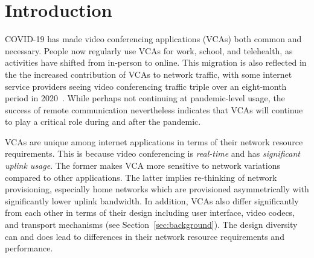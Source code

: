 \section{Introduction}\label{sec:intro}
COVID-19 has made video conferencing applications (VCAs) both common and necessary. People now regularly use VCAs for work, school, and telehealth, as activities have shifted from in-person to online. This migration is also reflected in the the increased contribution of VCAs to network traffic, with some internet service providers seeing video conferencing traffic triple over an eight-month period in 2020~\cite{bitag_report}. While perhaps not continuing at pandemic-level usage, the success of remote communication nevertheless indicates that VCAs will continue to play a critical role during and after the pandemic.



VCAs are unique among internet applications in terms of their network resource requirements. This is because video conferencing is \textit{real-time} and has \textit{significant uplink usage}. The former makes VCA more sensitive to network variations compared to other applications. The latter implies re-thinking of network provisioning, especially home networks which are provisioned asymmetrically with significantly lower uplink bandwidth. In addition, VCAs also differ significantly from each other in terms of their design including user interface, video codecs, and transport mechanisms (see Section~\ref{sec:background}). The design diversity can and does lead to differences in their network resource requirements and performance.     %

